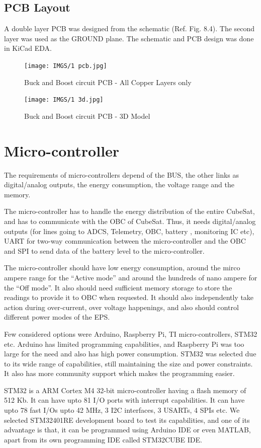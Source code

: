 \subsection{PCB Layout}
 A double layer PCB was designed from the schematic (Ref. Fig. 8.4). The second layer was used as the GROUND plane. The schematic and PCB design was done in KiCad EDA. 
 
  \begin{figure}[h]
 	\centering
 	\texttt{[image: IMGS/1 pcb.jpg]}
 	\caption{\centering Buck and Boost circuit PCB - All Copper Layers only}
 	\label{fig:bubopcb}
 \end{figure}
 
   \begin{figure}[H]
 	\centering
 	\texttt{[image: IMGS/1 3d.jpg]}
 	\caption{\centering Buck and Boost circuit PCB - 3D Model}
 	\label{fig:bubopcb3d}
 \end{figure}
\pagebreak

 
 \section{Micro-controller}
 The requirements of micro-controllers depend of the BUS, the other links as digital/analog outputs, the energy consumption, the voltage range and the memory.
 \par
 The micro-controller has to handle the energy distribution of the entire CubeSat, and has to communicate with the OBC of CubeSat. Thus, it needs digital/analog outputs (for lines going to ADCS, Telemetry, OBC, battery , monitoring IC etc), UART for two-way communication between the micro-controller and the OBC and SPI to  send data of the battery level to the micro-controller.
 \par
 The micro-controller should have low energy consumption, around the mirco ampere range for the “Active mode” and around the hundreds of nano ampere for the “Off mode”. It also should need sufficient memory storage to store the readings to provide it to OBC when requested. It should also independently take action during over-current, over voltage happenings, and also should control different power modes of the EPS.
 \par
 Few considered options were Arduino, Raspberry Pi, TI micro-controllers, STM32 etc. Arduino has limited programming capabilities, and Raspberry Pi was too large for the need and also has high power consumption. STM32 was selected due to its wide range of capabilities, still maintaining the size and power constraints. It also has more community support which makes the programming easier.
 \par
 STM32 is a ARM Cortex M4 32-bit micro-controller having a flash memory of 512 Kb. It can have upto 81 I/O ports with interrupt capabilities. It can have upto 78 fast I/Os upto 42 MHz, 3 I2C interfaces, 3 USARTs, 4 SPIs etc. We selected STM32401RE development board to test its capabilities, and one of its advantage is that, it can be programmed using Arduino IDE or even MATLAB, apart from its own programming IDE called STM32CUBE IDE.

